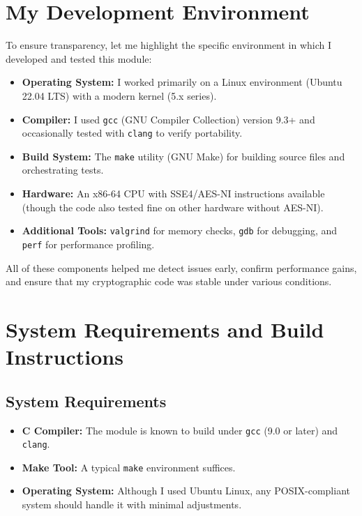 \documentclass[11pt,a4paper]{report}
\theoremstyle{definitionstyle}
\begin{document}
\section{My Development Environment}
To ensure transparency, let me highlight the specific environment in which I developed and tested this module:

\begin{itemize}
	\item \textbf{Operating System:} I worked primarily on a Linux environment (Ubuntu 22.04 LTS) with a modern kernel (5.x series).
	\item \textbf{Compiler:} I used \texttt{gcc} (GNU Compiler Collection) version 9.3+ and occasionally tested with \texttt{clang} to verify portability. 
	\item \textbf{Build System:} The \texttt{make} utility (GNU Make) for building source files and orchestrating tests.
	\item \textbf{Hardware:} An x86-64 CPU with SSE4/AES-NI instructions available (though the code also tested fine on other hardware without AES-NI).
	\item \textbf{Additional Tools:} \texttt{valgrind} for memory checks, \texttt{gdb} for debugging, and \texttt{perf} for performance profiling.
\end{itemize}

All of these components helped me detect issues early, confirm performance gains, and ensure that my cryptographic code was stable under various conditions.

\section{System Requirements and Build Instructions}

\subsection{System Requirements}
\begin{itemize}
	\item \textbf{C Compiler:} The module is known to build under \texttt{gcc} (9.0 or later) and \texttt{clang}.
	\item \textbf{Make Tool:} A typical \texttt{make} environment suffices.
	\item \textbf{Operating System:} Although I used Ubuntu Linux, any POSIX-compliant system should handle it with minimal adjustments.
\end{itemize}
\end{document}
